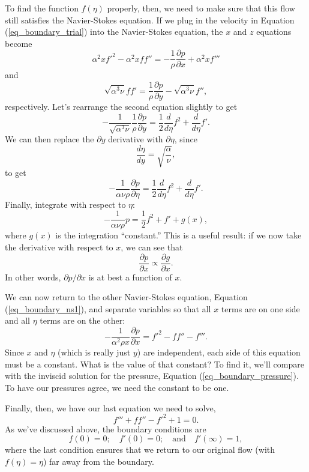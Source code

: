 To find the function $f(\eta)$ properly, then, we need to make sure that this flow still satisfies the Navier-Stokes equation.  If we plug in the velocity in Equation (\ref{eq_boundary_trial}) into the Navier-Stokes equation, the $x$ and $z$ equations become
\begin{equation}
\label{eq_boundary_ns1}
\alpha^2 x f'^2 - \alpha^2 x f f'' = -\frac{1}{\rho} \frac{\partial p}{\partial x} + \alpha^2 x f'''
\end{equation}
and
\begin{equation}
\sqrt{\alpha^3 \nu } ff' = \frac{1}{\rho} \frac{\partial p}{\partial y} - \sqrt{\alpha^3 \nu} f'',
\end{equation}
respectively.  Let's rearrange the second equation slightly to get
\[
-\frac{1}{\sqrt{\alpha^3 \nu}} \frac{1}{\rho} \frac{\partial p}{\partial y} = \frac{1}{2} \frac{d}{d\eta} f^2 + \frac{d}{d\eta} f'.
\]
We can then replace the $\partial y$ derivative with $\partial \eta$, since
\[
\frac{d\eta}{dy} = \sqrt{\frac{\alpha}{\nu}},
\]
to get
\[
-\frac{1}{\alpha \nu \rho} \frac{\partial p}{\partial \eta} = \frac{1}{2} \frac{d}{d\eta} f^2 + \frac{d}{d\eta} f'.
\]
Finally, integrate with respect to $\eta$:
\[
-\frac{1}{\alpha \nu \rho} p = \frac{1}{2} f^2 + f' + g(x),
\]
where $g(x)$ is the integration ``constant.''  This is a useful result:  if we now take the derivative with respect to $x$, we can see that 
\[
\frac{\partial p}{\partial x} \propto \frac{\partial g}{\partial x}.
\]
In other words, $\partial p / \partial x$ is at best a function of $x$.

We can now return to the other Navier-Stokes equation, Equation (\ref{eq_boundary_ns1}), and separate variables so that all $x$ terms are on one side and all $\eta$ terms are on the other:
\[
-\frac{1}{\alpha^2 \rho x} \frac{\partial p}{\partial x} = f'^2 - ff'' - f'''.
\]
Since $x$ and $\eta$ (which is really just $y$) are independent, each side of this equation must be a constant.  What is the value of that constant?  To find it, we'll compare with the inviscid solution for the pressure, Equation (\ref{eq_boundary_pressure}).  To have our pressures agree, we need the constant to be one.

Finally, then, we have our last equation we need to solve,
\begin{equation}
f''' + ff'' - f'^2 + 1 = 0.
\end{equation}
As we've discussed above, the boundary conditions are
\[
f(0) = 0; \quad f'(0) = 0; \quad \text{and} \quad f'(\infty) = 1,
\]
where the last condition ensures that we return to our original flow (with $f(\eta) = \eta$) far away from the boundary.


